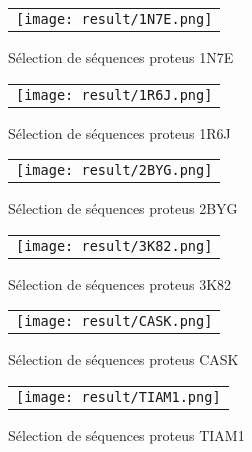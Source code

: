     \clearpage
   \begin{figure}[t]
     \centering
     \begin{tabular}{c}
       \texttt{[image: result/1N7E.png]} \\
     \end{tabular}
     \caption{Sélection de séquences proteus 1N7E }
\label{result:1N7E}
   \end{figure}

   \begin{figure}[t]
     \centering
     \begin{tabular}{c}
       \texttt{[image: result/1R6J.png]} \\
     \end{tabular}
     \caption{Sélection de séquences proteus 1R6J }
\label{result:1R6J}
   \end{figure}

    \clearpage

   \begin{figure}[t]
     \centering
     \begin{tabular}{c}
       \texttt{[image: result/2BYG.png]} \\
     \end{tabular}
     \caption{Sélection de séquences proteus 2BYG }
\label{result:2BYG}
   \end{figure}

   \begin{figure}[t]
     \centering
     \begin{tabular}{c}
       \texttt{[image: result/3K82.png]} \\
     \end{tabular}
     \caption{Sélection de séquences proteus 3K82 }
\label{result:3K82}
   \end{figure}

    \clearpage

   \begin{figure}[t]
     \centering
     \begin{tabular}{c}
       \texttt{[image: result/CASK.png]} \\
     \end{tabular}
     \caption{Sélection de séquences proteus CASK }
\label{result:CASK}
   \end{figure}

   \begin{figure}[t]
     \centering
     \begin{tabular}{c}
       \texttt{[image: result/TIAM1.png]} \\
     \end{tabular}
     \caption{Sélection de séquences proteus TIAM1 }
\label{result:TIAM1}
   \end{figure}

